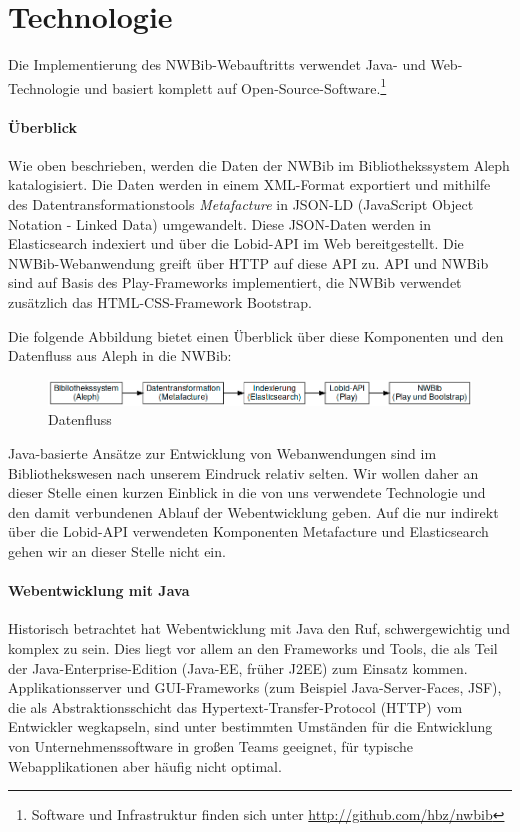 \documentclass[a4paper,
fontsize=11pt,
oneside,
numbers=noperiodatend,
parskip=half-,
bibliography=totoc,
final
]{scrartcl}
\begin{document}
\section*{Technologie}\label{technologie}

Die Implementierung des NWBib-Webauftritts verwendet Java- und
Web-Technologie und basiert komplett auf Open-Source-Software.\footnote{Software
  und Infrastruktur finden sich unter \url{http://github.com/hbz/nwbib}}

\paragraph{Überblick}\label{uxfcberblick}

Wie oben beschrieben, werden die Daten der NWBib im Bibliothekssystem
Aleph katalogisiert. Die Daten werden in einem XML-Format exportiert und
mithilfe des Datentransformationstools \emph{Metafacture} in JSON-LD
(JavaScript Object Notation - Linked Data) umgewandelt. Diese JSON-Daten
werden in Elastic\-search indexiert und über die Lobid-API im Web
bereitgestellt. Die NWBib-Webanwendung greift über HTTP auf diese API
zu. API und NWBib sind auf Basis des Play-Frameworks implementiert, die
NWBib verwendet zusätzlich das HTML-CSS-Framework Bootstrap.

Die folgende Abbildung bietet einen Überblick über diese Komponenten und
den Datenfluss aus Aleph in die NWBib:

\begin{figure}[htbp]
\centering
\includegraphics{img/data-workflow.png}
\caption{Datenfluss}
\end{figure}

Java-basierte Ansätze zur Entwicklung von Webanwendungen sind im
Bibliothekswesen nach unserem Eindruck relativ selten. Wir wollen daher
an dieser Stelle einen kurzen Einblick in die von uns verwendete
Technologie und den damit verbundenen Ablauf der Webentwicklung geben.
Auf die nur indirekt über die Lobid-API verwendeten Komponenten
Metafacture und Elasticsearch gehen wir an dieser Stelle nicht ein.

\paragraph{Webentwicklung mit Java}\label{webentwicklung-mit-java}

Historisch betrachtet hat Webentwicklung mit Java den Ruf,
schwergewichtig und komplex zu sein. Dies liegt vor allem an den
Frameworks und Tools, die als Teil der Java-Enterprise-Edition (Java-EE,
früher J2EE) zum Einsatz kommen. Applikationsserver und GUI-Frameworks
(zum Beispiel Java-Server-Faces, JSF), die als Abstraktionsschicht das
Hypertext-Transfer-Protocol (HTTP) vom Entwickler wegkapseln, sind unter
bestimmten Umständen für die Entwicklung von Unternehmenssoftware in
großen Teams geeignet, für typische Webapplikationen aber häufig nicht
optimal.
\end{document}

